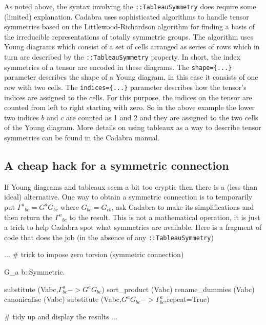 \documentclass[a4paper,12pt]{article}
\numberwithin{equation}{section}%
\begin{document}
As noted above, the syntax involving the \verb|::TableauSymmetry| does require some (limited)
explanation. Cadabra uses sophisticated algorithms to handle tensor symmetries based on
the Littlewood-Richardson algorithm for finding a basis of the irreducible representations of
totally symmetric groups. The algorithm uses Young diagrams which consist of a set of cells
arranged as series of rows which in turn are described by the \verb|::TableauSymmetry|
property. In short, the index symmetries of a tensor are encoded in these diagrams. The
\verb|shape={...}| parameter describes the shape of a Young diagram, in this case it consists
of one row with two cells. The \verb|indices={...}| parameter describes how the tensor's
indices are assigned to the cells. For this purpose, the indices on the tensor are counted
from left to right starting with zero. So in the above example the lower two indices $b$ and
$c$ are counted as 1 and 2 and they are assigned to the two cells of the Young diagram. More
details on using tableaux as a way to describe tensor symmetries can be found in the Cadabra
manual.

\subsection{A cheap hack for a symmetric connection}
\label{sec:cheap-hack}

If Young diagrams and tableaux seem a bit too cryptic then there is a (less than ideal)
alternative. One way to obtain a symmetric connection is to temporarily put
$\Gamma^{a}{}_{bc} = G^{a} G_{bc}$ where $G_{bc}=G_{cb}$, ask Cadabra to make its
simplifications and then return the $\Gamma^{a}{}_{bc}$ to the result. This is not a
mathematical operation, it is just a trick to help Cadabra spot what symmetries are
available. Here is a fragment of code that does the job (in the absence of any
\verb|::TableauSymmetry|)

\begin{cadabra}[numbers=none]
   ...
   # trick to impose zero torsion (symmetric connection)

   G_{a b}::Symmetric.

   substitute     (Vabc,$\Gamma^{a}_{b c} ->  G^{a} G_{b c}$)
   sort_product   (Vabc)
   rename_dummies (Vabc)
   canonicalise   (Vabc)
   substitute     (Vabc,$G^{a} G_{b c} -> \Gamma^{a}_{b c}$,repeat=True)

   # tidy up and display the results
   ...
\end{cadabra}
\end{document}
